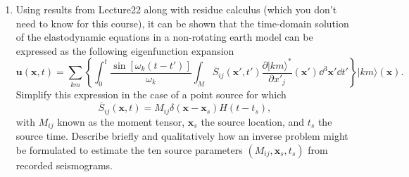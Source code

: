 \documentclass[a4paper,10pt]{paper}
\providecommand{\DIFadd}[1]{{\protect\color{blue}\uwave{#1}}} %
\providecommand{\DIFaddbegin}{} %
\providecommand{\DIFaddend}{} %
\begin{document}
\begin{enumerate}
\item Using results from Lecture\DIFaddbegin \DIFadd{~}\DIFaddend 22 along with residue calculus (which you don't need to know for this course), it can be shown that the time-domain solution of the elastodynamic equations in a non-rotating earth model can be expressed as the following eigenfunction expansion
\begin{equation*}
    \mathbf{u}(\mathbf{x},t)=\sum_{km}\left\{\int_{0}^{t}\frac{\sin[\omega_{k}(t-t')]}{\omega_{k}}\int_{M}\overline{S}_{ij}(\mathbf{x}',t')\frac{\partial|km\rangle^{*}}{\partial x'_{j}}(\mathbf{x}')\dd^{3}\mathbf{x}'\dd t'\right\}|km\rangle(\mathbf{x}).
\end{equation*}
Simplify this expression in the case of a point source for which
\begin{equation*}
    \overline{S}_{ij}(\mathbf{x},t)=M_{ij}\delta(\mathbf{x}-\mathbf{x}_{s})H(t-t_{s}),
\end{equation*}
with $M_{ij}$ known as the moment tensor, $\mathbf{x}_{s}$ the source location, and $t_{s}$ the source time. Describe briefly and qualitatively how an inverse problem might be formulated to estimate the ten source parameters $(M_{ij},\mathbf{x}_{s},t_{s})$ from recorded seismograms.


\end{enumerate}
\end{document}
